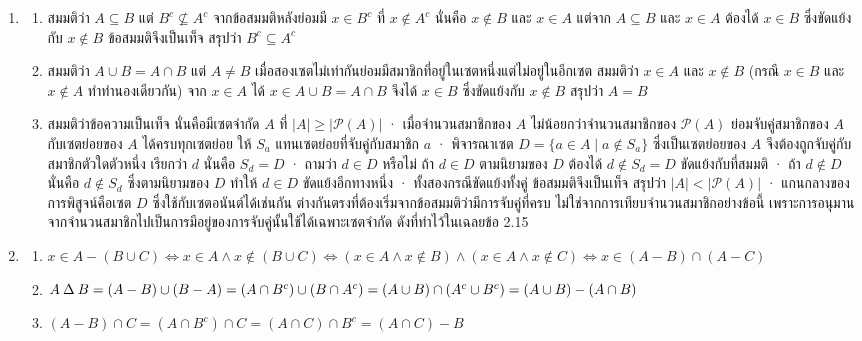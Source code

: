 \begin{enumerate}[resume*=anskey]
    \item
    \begin{enumerate}[label=\textbf{\thechapter.\arabic{enumi}.\arabic*}]
        \item สมมติว่า $A \subseteq B$ แต่ $B^c \not\subseteq A^c$ จากข้อสมมติหลังย่อมมี $x \in B^c$ ที่ $x \notin A^c$ นั่นคือ $x \notin B$ และ $x \in A$ แต่จาก $A \subseteq B$ และ $x \in A$ ต้องได้ $x \in B$ ซึ่งขัดแย้งกับ $x \notin B$ ข้อสมมติจึงเป็นเท็จ สรุปว่า $B^c \subseteq A^c$
        \item สมมติว่า $A \cup B = A \cap B$ แต่ $A \neq B$ เมื่อสองเซตไม่เท่ากันย่อมมีสมาชิกที่อยู่ในเซตหนึ่งแต่ไม่อยู่ในอีกเซต สมมติว่า $x \in A$ และ $x \notin B$ (กรณี $x \in B$ และ $x \notin A$ ทำทำนองเดียวกัน) จาก $x \in A$ ได้ $x \in A \cup B = A \cap B$ จึงได้ $x \in B$ ซึ่งขัดแย้งกับ $x \notin B$ สรุปว่า $A = B$
        \item สมมติว่าข้อความเป็นเท็จ นั่นคือมีเซตจำกัด $A$ ที่ $|A| \geq |\mathcal{P}(A)|$ · เมื่อจำนวนสมาชิกของ $A$ ไม่น้อยกว่าจำนวนสมาชิกของ $\mathcal{P}(A)$ ย่อมจับคู่สมาชิกของ $A$ กับเซตย่อยของ $A$ ได้ครบทุกเซตย่อย ให้ $S_a$ แทนเซตย่อยที่จับคู่กับสมาชิก $a$ · พิจารณาเซต $D = \{a \in A \mid a \notin S_a\}$ ซึ่งเป็นเซตย่อยของ $A$ จึงต้องถูกจับคู่กับสมาชิกตัวใดตัวหนึ่ง เรียกว่า $d$ นั่นคือ $S_d = D$ · ถามว่า $d \in D$ หรือไม่ ถ้า $d \in D$ ตามนิยามของ $D$ ต้องได้ $d \notin S_d = D$ ขัดแย้งกับที่สมมติ · ถ้า $d \notin D$ นั่นคือ $d \notin S_d$ ซึ่งตามนิยามของ $D$ ทำให้ $d \in D$ ขัดแย้งอีกทางหนึ่ง · ทั้งสองกรณีขัดแย้งทั้งคู่ ข้อสมมติจึงเป็นเท็จ สรุปว่า $|A| < |\mathcal{P}(A)|$ · แกนกลางของการพิสูจน์คือเซต $D$ ซึ่งใช้กับเซตอนันต์ได้เช่นกัน ต่างกันตรงที่ต้องเริ่มจากข้อสมมติว่ามีการจับคู่ที่ครบ ไม่ใช่จากการเทียบจำนวนสมาชิกอย่างข้อนี้ เพราะการอนุมานจากจำนวนสมาชิกไปเป็นการมีอยู่ของการจับคู่นั้นใช้ได้เฉพาะเซตจำกัด ดังที่ทำไว้ในเฉลยข้อ 2.15
    \end{enumerate}

    \item
    \begin{enumerate}[label=\textbf{\thechapter.\arabic{enumi}.\arabic*}]
        \item $x \in A - (B \cup C) \iff x \in A \land x \notin (B \cup C) \iff (x \in A \land x \notin B) \land (x \in A \land x \notin C) \iff x \in (A - B) \cap (A - C)$
        \item $A \mathbin{\Delta} B = (A - B) \cup (B - A) = (A \cap B^c) \cup (B \cap A^c) = (A \cup B) \cap (A^c \cup B^c) = (A \cup B) - (A \cap B)$
        \item $(A - B) \cap C = (A \cap B^c) \cap C = (A \cap C) \cap B^c = (A \cap C) - B$
    \end{enumerate}
\end{enumerate}

